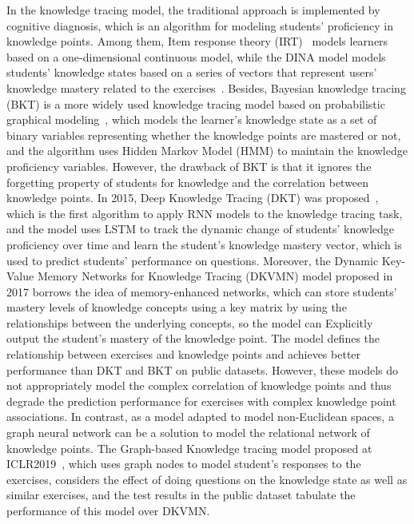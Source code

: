 In the knowledge tracing model, the traditional approach is implemented by cognitive diagnosis, which is an algorithm for modeling students' proficiency in knowledge points. Among them, Item response theory (IRT)~\cite{pliakos_integrating_2019} models learners based on a one-dimensional continuous model, while the DINA model models students' knowledge states based on a series of vectors that represent users' knowledge mastery related to the exercises~\cite{huang2020utilizing}. Besides, Bayesian knowledge tracing (BKT) is a more widely used knowledge tracing model based on probabilistic graphical modeling~\cite{yudelson2013individualized}, which models the learner's knowledge state as a set of binary variables representing whether the knowledge points are mastered or not, and the algorithm uses Hidden Markov Model (HMM) to maintain the knowledge proficiency variables. However, the drawback of BKT is that it ignores the forgetting property of students for knowledge and the correlation between knowledge points. In 2015, Deep Knowledge Tracing (DKT) was proposed~\cite{piech2015deep}, which is the first algorithm to apply RNN models to the knowledge tracing task, and the model uses LSTM to track the dynamic change of students' knowledge proficiency over time and learn the student's knowledge mastery vector, which is used to predict students' performance on questions. Moreover, the Dynamic Key-Value Memory Networks for Knowledge Tracing (DKVMN) model proposed in 2017 borrows the idea of memory-enhanced networks, which can store students' mastery levels of knowledge concepts using a key matrix by using the relationships between the underlying concepts, so the model can Explicitly output the student's mastery of the knowledge point. The model defines the relationship between exercises and knowledge points and achieves better performance than DKT and BKT on public datasets. However, these models do not appropriately model the complex correlation of knowledge points and thus degrade the prediction performance for exercises with complex knowledge point associations. In contrast, as a model adapted to model non-Euclidean spaces, a graph neural network can be a solution to model the relational network of knowledge points. The Graph-based Knowledge tracing model proposed at ICLR2019~\cite{nakagawa2019graph}, which uses graph nodes to model student's responses to the exercises, considers the effect of doing questions on the knowledge state as well as similar exercises, and the test results in the public dataset tabulate the performance of this model over DKVMN.


